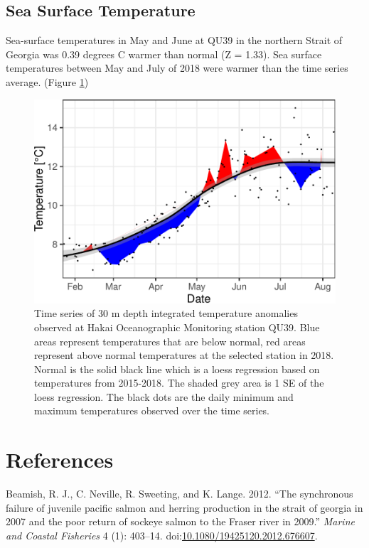 \documentclass[fleqn,10pt]{wlpeerj} %
\begin{document}
\subsection*{Sea Surface Temperature}\label{sea-surface-temperature}

Sea-surface temperatures in May and June at QU39 in the northern Strait
of Georgia was 0.39 degrees C warmer than normal (Z = 1.33). Sea surface
temperatures between May and July of 2018 were warmer than the time
series average. (Figure \ref{fig:sst})

\begin{figure}[H]
\includegraphics[width=0.8\linewidth]{peer_j_migration_dynamics_files/figure-latex/sst-1} \caption{Time series of 30 m depth integrated temperature anomalies observed at Hakai Oceanographic Monitoring station QU39. Blue areas represent temperatures that are below normal, red areas represent above normal temperatures at the selected station in 2018. Normal is the solid black line which is a loess regression based on temperatures from 2015-2018. The shaded grey area is 1 SE of the loess regression. The black dots are the daily minimum and maximum temperatures observed over the time series.}\label{fig:sst}
\end{figure}

\section*{References}\label{references}

\hypertarget{refs}{}
\hypertarget{ref-Beamish2012}{}
Beamish, R. J., C. Neville, R. Sweeting, and K. Lange. 2012. ``The
synchronous failure of juvenile pacific salmon and herring production in
the strait of georgia in 2007 and the poor return of sockeye salmon to
the Fraser river in 2009.'' \emph{Marine and Coastal Fisheries} 4 (1):
403--14.
doi:\href{https://doi.org/10.1080/19425120.2012.676607}{10.1080/19425120.2012.676607}.
\end{document}
